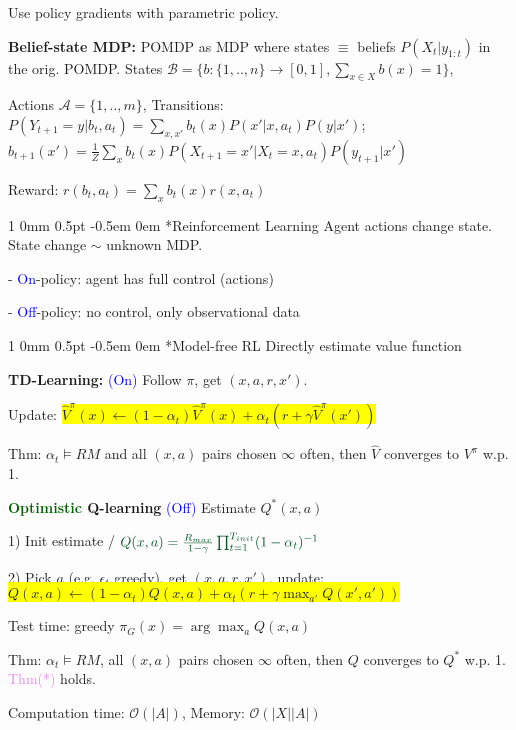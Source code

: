 \documentclass[11pt,landscape,a4paper,fleqn]{article}
\makeatletter
\newcommand*{\rsection}{%
	\@startsection{section}%
	{1}%
	{0mm}%
	{0.5pt}%
	{-0.5em \@plus 0em}
	{\color{myorange}\sffamily\small\bfseries}}
\newcommand{\mhl}[1]{\setlength{\fboxsep}{0pt}\colorbox{yellow}{#1}}
\makeatother
\begin{document}
\begin{multicols*}{4}
Use policy gradients with parametric policy.

\textbf{Belief-state MDP:} POMDP as MDP where states $\equiv$ beliefs $P(X_t | y_{1:t})$ in the orig. POMDP. States $\mathcal{B} = \{b : \{1,..,n\} \rightarrow [0,1], \sum_{x \in X} b(x) = 1\}$,

{\fontsize{9.5}{6}\selectfont Actions $\mathcal{A} = \{1,..,m\}$}, Transitions: $P(Y_{t+1} = y | b_t, a_t) = \sum_{x,x'} b_t(x) P(x' | x, a_t) P(y | x')$;
$b_{t+1}(x') = \frac{1}{Z} \sum_x b_t(x) P(X_{t+1} = x' | X_t = x, a_t) P(y_{t+1} | x')$

Reward: $r(b_t, a_t) = \sum_x b_t(x) r(x, a_t)$

\vspace*{1mm}
\rsection*{Reinforcement Learning} Agent actions change state. State change $\sim$ unknown MDP.

- \textcolor{blue}{On}-policy: agent has full control (actions)

- \textcolor{blue}{Off}-policy: no control, only observational data 


\vspace*{1mm}
\rsection*{Model-free RL} {\fontsize{9.5}{6}\selectfont Directly estimate value function}

\textbf{TD-Learning:} {\fontsize{9}{6}\selectfont \textcolor{blue}{(On)}} Follow $\pi$, get $(x,a,r,x')$. 

Update: \mhl{$\hat{V}^\pi(x) \leftarrow (1 - \alpha_t) \hat{V}^\pi(x) + \alpha_t (r + \gamma \hat{V}^\pi(x'))$}

Thm: $\alpha_t \vDash RM$ and all $(x,a)$ pairs chosen $\infty$ often, then $\hat{V}$ converges to $V^\pi$ w.p. 1.


\textbf{\textcolor{darkgreen}{Optimistic} Q-learning} {\fontsize{9}{6}\selectfont \textcolor{blue}{(Off)}} Estimate $Q^*(x,a)$

1) Init estimate / $\textcolor{darkgreen}{Q(x,a) = \frac{R_{max}}{1 - \gamma} \prod_{t=1}^{T_{init}} (1 - \alpha_t)^{-1}}$

2) Pick $a$ (e.g. $\epsilon_t$ greedy), get $(x,a,r,x')$, update: \mhl{$Q(x,a) \leftarrow (1 - \alpha_t) Q(x,a) + \alpha_t (r + \gamma \max_{a'} Q(x', a'))$}

Test time: greedy $\pi_G(x) = \arg\max_a Q(x,a)$

Thm: $\alpha_t \vDash RM$, all $(x,a)$ pairs chosen $\infty$ often, then $Q$ converges to $Q^*$ w.p. 1. \textcolor{violet}{Thm(*)} holds.

Computation time: $\mathcal{O}(|A|)$, Memory: $\mathcal{O}(|X||A|)$


\end{multicols*}
\end{document}
